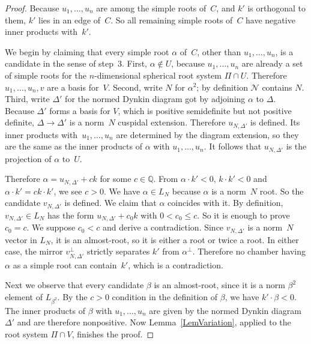 \documentclass[12pt]{amsart}
\def\calN{\mathcal{N}}
\def\Q{\mathbb{Q}}
\def\D{\Delta}
\numberwithin{theorem}{section}
\numberwithin{equation}{section}
\numberwithin{figure}{section}
\theoremstyle{remark}
\begin{document}
\begin{proof}
    Because $u_1,\dots,u_n$ are among the simple
    roots of~$C$,  and $k'$ is orthogonal to them, 
    $k'$ lies in an edge of~$C$.  So all remaining simple
    roots of~$C$ have negative inner products with~$k'$.

    We begin by claiming that every simple root $\alpha$ of~$C$, other than $u_1,\dots,u_n$, is
    a candidate in the sense of step~3.  First, $\alpha\notin U$, because $u_1,\dots,u_n$ are already
    a set of simple roots for the $n$-dimensional spherical root system
    $\Pi\cap U$.  
    Therefore $u_1,\dots,u_n,v$ are a basis for~$V$.
    Second, write $N$ for $\alpha^2$; by definition $\calN$ contains $N$.  
    Third, write $\D'$ for the 
    normed Dynkin diagram got by adjoining $\alpha$ to $\D$.  Because
    $\D'$ forms a basis for $V$, which is positive semidefinite but not
    positive definite, $\D\to\D'$ is a norm~$N$ cuspidal extension.
    Therefore $u_{N,\D'}$ is defined.  Its inner products with~$u_1,\dots,u_n$
    are determined by the diagram extension, so they are the same as the
    inner products of $\alpha$ with $u_1,\dots,u_n$.  It follows that $u_{N,\D'}$
    is the projection of $\alpha$ to~$U$.  

    Therefore $\alpha=u_{N,\D'}+ck$ for
    some $c\in\Q$.  
    From $\alpha\cdot k'<0$, $k\cdot k'<0$ and
    $\alpha\cdot k'=ck\cdot k'$, 
    we see $c>0$.
    We have $\alpha\in L_N$ because  $\alpha$ is a norm~$N$ root. So
    the candidate $v_{N,\D'}$ is defined.  
    We claim that $\alpha$ coincides with it.  By definition, $v_{N,\D'}\in L_N$ has the
    form $u_{N,\D'}+c_0k$ with $0<c_0\leq c$.  
    So it is enough to prove $c_0=c$.  We suppose $c_0<c$
    and derive a contradiction.
    Since $v_{N,\D'}$
    is a norm~$N$ vector in $L_N$, it is an almost-root, so
    it is either a root or twice a root.  In either case,
     the mirror $v_{N,\D'}^\perp$ strictly separates $k'$ from
    $\alpha^\perp$.
    Therefore no chamber having $\alpha$ as a simple root can 
    contain~$k'$, which is a contradiction.

    Next we observe that every candidate $\beta$ is an almost-root,
    since it is a norm $\beta^2$ element of $L_{\beta^2}$.  By
    the $c>0$ condition in the definition of $\beta$, we have $k'\cdot\beta<0$.
    The inner products of $\beta$ with $u_1,\dots,u_n$ are given by
    the normed Dynkin diagram $\D'$ and are therefore nonpositive.
    Now Lemma~\ref{LemVariation}, applied
    to the root system $\Pi\cap V$, finishes the proof.
\end{proof}
\end{document}
